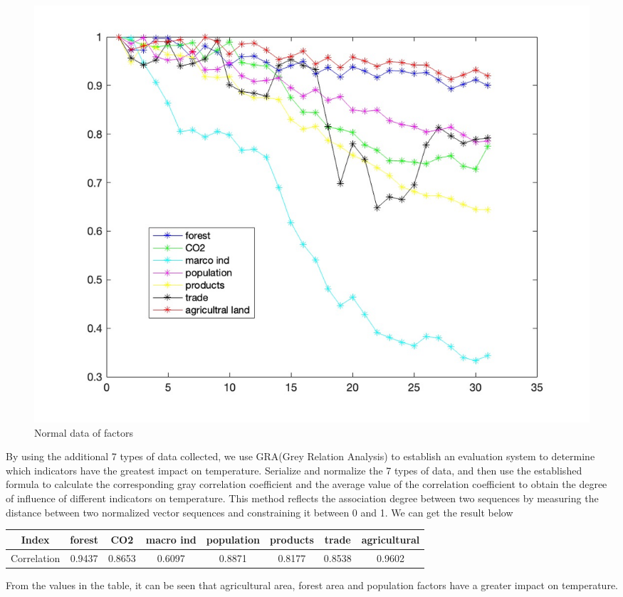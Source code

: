 \documentclass{apmcmthesis}
\begin{document}
  \begin{figure}[htbp]
    \centering
    \includegraphics[scale=0.25]{2c2.jpg}
    \caption{Normal data of factors}
  \end{figure}
  
  By using the additional 7 types of data collected, we use GRA(Grey Relation Analysis) to establish an evaluation system to determine which indicators have the greatest impact on temperature.
  Serialize and normalize the 7 types of data, and then use the established formula to calculate the corresponding gray correlation coefficient and the average value of the correlation coefficient to obtain the degree of influence of different indicators on temperature. This method reflects the association degree between two sequences by measuring the distance between two normalized vector sequences and constraining it between 0 and 1.
  We can get the result below
  \begin{center}
    \begin{tabular}{c|ccccccc}
      \hline
      Index &forest& CO2 & macro ind & population & products & trade & agricultural\\
      \hline
      Correlation & 0.9437&	0.8653&	0.6097&	0.8871&	0.8177&	0.8538&	0.9602\\
      \hline
      \end{tabular}
  \end{center}
  
  From the values in the table, it can be seen that agricultural area, forest area and population factors have a greater impact on temperature. 
  
\end{document}
